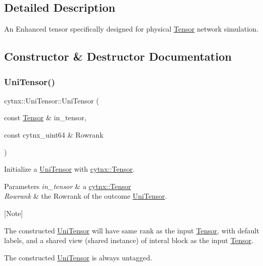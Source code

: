 \subsection{Detailed Description}
An Enhanced tensor specifically designed for physical \hyperlink{classcytnx_1_1Tensor}{Tensor} network simulation. 

\subsection{Constructor \& Destructor Documentation}
\mbox{\label{classcytnx_1_1UniTensor_a7a5b9286ae4bc1ef5afa00105f222a13}} 
\subsubsection{\texorpdfstring{Uni\+Tensor()}{UniTensor()}\hspace{0.1cm}{\footnotesize\ttfamily [1/2]}}
{\footnotesize\ttfamily cytnx\+::\+Uni\+Tensor\+::\+Uni\+Tensor (\begin{DoxyParamCaption}\item[{const \hyperlink{classcytnx_1_1Tensor}{Tensor} \&}]{in\+\_\+tensor,  }\item[{const cytnx\+\_\+uint64 \&}]{Rowrank }\end{DoxyParamCaption})\hspace{0.3cm}{\ttfamily [inline]}}



Initialize a \hyperlink{classcytnx_1_1UniTensor}{Uni\+Tensor} with \hyperlink{classcytnx_1_1Tensor}{cytnx\+::\+Tensor}. 


\begin{DoxyParams}{Parameters}
{\em in\+\_\+tensor} & a \hyperlink{classcytnx_1_1Tensor}{cytnx\+::\+Tensor} \\
\hline
{\em Rowrank} & the Rowrank of the outcome \hyperlink{classcytnx_1_1UniTensor}{Uni\+Tensor}.\\
\hline
\end{DoxyParams}
\mbox{[}Note\mbox{]}
\begin{DoxyEnumerate}
\item The constructed \hyperlink{classcytnx_1_1UniTensor}{Uni\+Tensor} will have same rank as the input \hyperlink{classcytnx_1_1Tensor}{Tensor}, with default labels, and a shared view (shared instance) of interal block as the input \hyperlink{classcytnx_1_1Tensor}{Tensor}.
\item The constructed \hyperlink{classcytnx_1_1UniTensor}{Uni\+Tensor} is always untagged. 
\end{DoxyEnumerate}\mbox{\label{classcytnx_1_1UniTensor_acc305e7b7767843bd282a9c2cc49114c}} 
